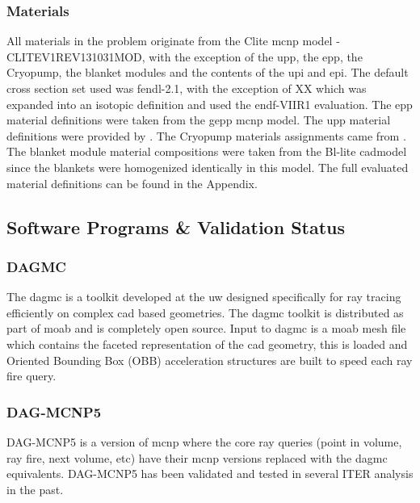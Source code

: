 \documentclass[12pt]{article}
\begin{document}
\newpage
\clearpage
\subsubsection{Materials}
All materials in the problem originate from the Clite \gls{mcnp} model -
CLITE\textunderscore V1\textunderscore REV131031\textunderscore MOD, with the
exception of the \gls{upp}, the \gls{epp}, the
Cryopump, the blanket modules and the contents of the \gls{upi} and \gls{epi}.
The default cross section set used was \gls{fendl}-2.1, with the exception of XX
which was expanded into an isotopic definition and used the \gls{endf}-VIIR1
evaluation. The \gls{epp} material definitions were taken from the \gls{gepp}
\gls{mcnp} model\cite{epp_materials}. The \gls{upp} material definitions were
provided by \cite{bertalot_communication}. The Cryopump materials assignments
came from \cite{cryopump_communication}. The blanket module material
compositions were taken from the Bl-lite \gls{cad}model since the blankets were
homogenized identically in this model. The full evaluated material definitions
can be found in the Appendix.
\newpage
\subsection{Software Programs \& Validation Status}
\subsubsection{DAGMC}
The \gls{dagmc} is a toolkit developed at the \gls{uw}
designed specifically for ray tracing efficiently on complex \gls{cad} based
geometries. The \gls{dagmc} toolkit is distributed as part of \gls{moab} and
is completely open source. Input to \gls{dagmc} is a \gls{moab} mesh file
which contains the faceted representation of the \gls{cad} geometry, this
is loaded and Oriented Bounding Box (OBB) acceleration structures are built
to speed each ray fire query.
\subsubsection{DAG-MCNP5}
DAG-MCNP5 \cite{dagmc} is a version of \gls{mcnp} \cite{mcnp} where the core ray
queries (point in volume, ray fire, next volume, etc) have their \gls{mcnp}
versions replaced with the \gls{dagmc} equivalents. DAG-MCNP5 has been validated
\cite{dagmc_validation} and tested in several ITER analysis in the past.
\end{document}
